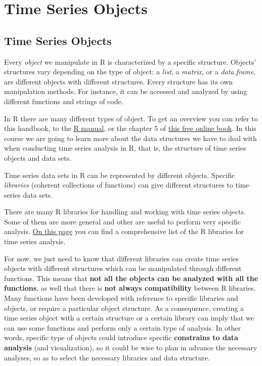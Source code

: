 \documentclass[
]{article}
\begin{document}
\section{Time Series Objects}\label{time-series-objects}

\subsection{Time Series Objects}\label{time-series-objects-1}

Every \emph{object} we manipulate in R is characterized by a specific structure. Objects' structures vary depending on the type of object: a \emph{list}, a \emph{matrix}, or a \emph{data.frame}, are different objects with different structures. Every structure has its own manipulation methods. For instance, it can be accessed and analyzed by using different functions and strings of code.

In R there are many different types of object. To get an overview you can refer to this handbook, to the \href{https://cran.r-project.org/doc/manuals/r-release/R-intro.html}{R manual}, or the chapter 5 of \href{https://rc2e.com/datastructures}{this free online book}. In this course we are going to learn more about the data structures we have to deal with when conducting time series analysis in R, that is, the structure of time series objects and data sets.

Time series data sets in R can be represented by different objects. Specific \emph{libraries} (coherent collections of functions) can give different structures to time series data sets.

There are many R libraries for handling and working with time series objects. Some of them are more general and other are useful to perform very specific analysis. \href{https://cran.r-project.org/web/views/TimeSeries.html}{On this page} you can find a comprehensive list of the R libraries for time series analysis.

For now, we just need to know that different libraries can create time series objects with different structures which can be manipulated through different functions. This means that \textbf{not all the objects can be analyzed with all the functions}, as well that there is \textbf{not always compatibility} between R libraries.
Many functions have been developed with reference to specific libraries and objects, or require a particular object structure. As a consequence, creating a time series object with a certain structure or a certain library can imply that we can use some functions and perform only a certain type of analysis. In other words, specific type of objects could introduce specific \textbf{constrains to data analysis} (and visualization), so it could be wise to plan in advance the necessary analyses, so as to select the necessary libraries and data structure.
\end{document}
